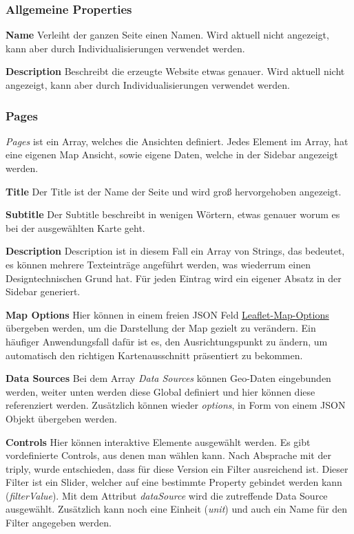 \subsubsection{Allgemeine Properties}
\textbf{Name}
Verleiht der ganzen Seite einen Namen.
Wird aktuell nicht angezeigt, kann aber durch Individualisierungen verwendet werden.

\textbf{Description}
Beschreibt die erzeugte Website etwas genauer.
Wird aktuell nicht angezeigt, kann aber durch Individualisierungen verwendet werden.

\subsubsection{Pages}
\emph{Pages} ist ein Array, welches die Ansichten definiert.
Jedes Element im Array, hat eine eigenen Map Ansicht, sowie eigene Daten, welche in der Sidebar angezeigt werden.

\textbf{Title}
Der Title ist der Name der Seite und wird groß hervorgehoben angezeigt.

\textbf{Subtitle}
Der Subtitle beschreibt in wenigen Wörtern, etwas genauer worum es bei der ausgewählten Karte geht.

\textbf{Description}
Description ist in diesem Fall ein Array von Strings, das bedeutet, es können mehrere Texteinträge angeführt werden,
was wiederrum einen Designtechnischen Grund hat.
Für jeden Eintrag wird ein eigener Absatz in der Sidebar generiert.

\textbf{Map Options}
Hier können in einem freien JSON Feld \href{https://leafletjs.com/SlavaUkraini/reference.html#map-option}{Leaflet-Map-Options}
übergeben werden, um die Darstellung der Map gezielt zu verändern.
Ein häufiger Anwendungsfall dafür ist es, den Ausrichtungspunkt zu ändern, um automatisch den richtigen Kartenausschnitt präsentiert zu bekommen.

\textbf{Data Sources}
Bei dem Array \emph{Data Sources} können Geo-Daten eingebunden werden, weiter unten werden diese Global definiert und hier
können diese referenziert werden.
Zusätzlich können wieder \emph{options}, in Form von einem JSON Objekt übergeben werden.

\textbf{Controls}
Hier können interaktive Elemente ausgewählt werden.
Es gibt vordefinierte Controls, aus denen man wählen kann.
Nach Absprache mit der triply, wurde entschieden, dass für diese Version ein Filter ausreichend ist.
Dieser Filter ist ein Slider, welcher auf eine bestimmte Property gebindet werden kann (\emph{filterValue}).
Mit dem Attribut \emph{dataSource} wird die zutreffende Data Source ausgewählt.
Zusätzlich kann noch eine Einheit (\emph{unit}) und auch ein Name für den Filter angegeben werden.

